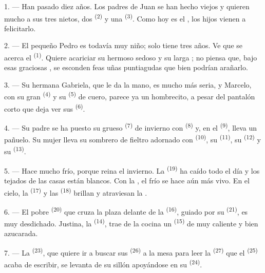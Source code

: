 1. --- Han pasado diez años. Los padres de Juan se han hecho viejos y
quieren mucho a sus tres nietos, dos  \textsuperscript{(2)} y una
 \textsuperscript{(3)}. Como hoy es el ,
los hijos vienen a felicitarlo.

2. --- El pequeño Pedro es todavía muy niño; solo tiene tres años. Ve que
se acerca el  \textsuperscript{(1)}. Quiere acariciar su hermoso
 sedoso y su larga ; no piensa que, bajo esas
graciosas , se esconden feas uñas puntiagudas que bien
podrían arañarlo.

3. --- Su hermana Gabriela, que le da la mano, es mucho más seria, y
Marcelo, con su gran  \textsuperscript{(4)} y su 
\textsuperscript{(5)} de cuero, parece ya un hombrecito, a pesar del pantalón
corto que deja ver sus  \textsuperscript{(6)}.

4. --- Su padre se ha puesto su grueso  \textsuperscript{(7)} de
invierno con  \textsuperscript{(8)} y, en el 
\textsuperscript{(9)}, lleva un pañuelo. Su mujer lleva su sombrero de fieltro
adornado con  \textsuperscript{(10)}, su 
\textsuperscript{(11)}, su  \textsuperscript{(12)} y su 
\textsuperscript{(13)}.

5. --- Hace mucho frío, porque reina el invierno. La 
\textsuperscript{(19)} ha caído todo el día y los tejados de las casas están
blancos. Con la , el frío se hace aún más vivo. En el cielo,
la  \textsuperscript{(17)} y las  \textsuperscript{(18)}
brillan y atraviesan la .

\VUsaut{4.2mm}
\VUsaut{3.0mm}

6. --- El pobre  \textsuperscript{(20)} que cruza la plaza delante de
la  \textsuperscript{(16)}, guiado por su 
\textsuperscript{(21)}, es muy desdichado. Justina, la 
\textsuperscript{(14)}, trae de la cocina un  \textsuperscript{(15)} de
 muy caliente y bien azucarada.

7. --- La  \textsuperscript{(23)}, que quiere ir a buscar sus
 \textsuperscript{(26)} a la mesa para leer la 
\textsuperscript{(27)} que el  \textsuperscript{(25)} acaba de escribir, se
levanta de su sillón apoyándose en su  \textsuperscript{(24)}.

